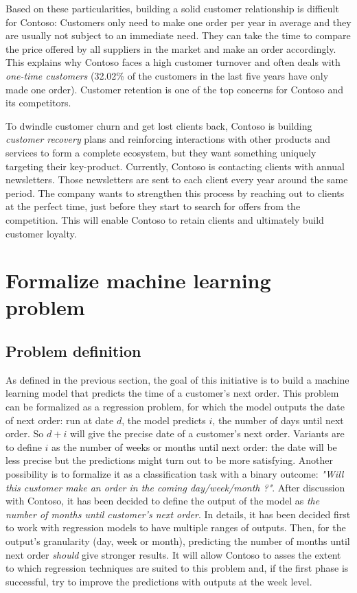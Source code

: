  Based on these particularities, building a solid customer relationship is difficult for Contoso: Customers only need to make one order per year in average and they are usually not subject to an immediate need. They can take the time to compare the price offered by all suppliers in the market and make an order accordingly. This explains why Contoso faces a high customer turnover and often deals with \textit{one-time customers} (32.02\% of the customers in the last five years have only made one order). Customer retention is one of the top concerns for Contoso and its competitors.
 
 To dwindle customer churn and get lost clients back, Contoso is building \textit{customer recovery} plans and reinforcing interactions with other products and services to form a complete ecosystem, but they want something uniquely targeting their key-product. Currently, Contoso is contacting clients with annual newsletters. Those newsletters are sent to each client every year around the same period. The company wants to strengthen this process by reaching out to clients at the perfect time, just before they start to search for offers from the competition. This will enable Contoso to retain clients and ultimately build customer loyalty.
 
 
\section{Formalize machine learning problem} \label{sec:ml-metrics}


\subsection{Problem definition}
As defined in the previous section, the goal of this initiative is to build a machine learning model that predicts the time of a customer's next order. This problem can be formalized as a regression problem, for which the model outputs the date of next order: run at date $d$, the model predicts $i$, the number of days until next order. So $d+i$ will give the precise date of a customer's next order. Variants are to define $i$ as the number of weeks or months until next order: the date will be less precise but the predictions might turn out to be more satisfying. Another possibility is to formalize it as a classification task with a binary outcome: \textit{"Will this customer make an order in the coming day/week/month ?"}. After discussion with Contoso, it has been decided to define the output of the model as \textit{the number of months until customer's next order}. In details, it has been decided first to work with regression models to have multiple ranges of outputs. Then, for the output's granularity (day, week or month), predicting the number of months until next order \textit{should} give stronger results. It will allow Contoso to asses the extent to which regression techniques are suited to this problem and, if the first phase is successful, try to improve the predictions with outputs at the week level.




